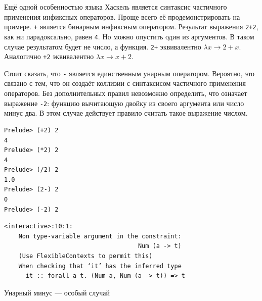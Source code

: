 Ещё одной особенностью языка Хаскель является синтаксис частичного применения
инфиксных операторов. Проще всего её продемонстрировать на примере. \texttt{+}
является бинарным инфиксным оператором. Результат выражения \texttt{2+2}, как
ни парадоксально, равен \texttt{4}. Но можно опустить один из аргументов. В
таком случае результатом будет не число, а функция. \texttt{2+} эквивалентно
$\lambda x \rightarrow 2 + x$. Аналогично \texttt{+2} эквивалентно
$\lambda x \rightarrow x + 2$.

Стоит сказать, что \texttt{-} является единственным унарным оператором.
Вероятно, это связано с тем, что он создаёт коллизии с синтаксисом частичного
применения операторов. Без дополнительных правил невозможно определить, что
означает выражение \texttt{-2}: функцию вычитающую двойку из своего аргумента
или число минус два. В этом случае действует правило считать такое выражение
числом.

\begin{ListingEnv}[H]
\begin{lstlisting}
Prelude> (+2) 2
4
Prelude> (*2) 2
4
Prelude> (/2) 2
1.0
Prelude> (2-) 2
0
Prelude> (-2) 2
\end{lstlisting}
\begin{verbatim}
<interactive>:10:1:
    Non type-variable argument in the constraint:
                                     Num (a -> t)
    (Use FlexibleContexts to permit this)
    When checking that ‘it’ has the inferred type
      it :: forall a t. (Num a, Num (a -> t)) => t
\end{verbatim}
\caption{Унарный минус --- особый случай}
\end{ListingEnv}

